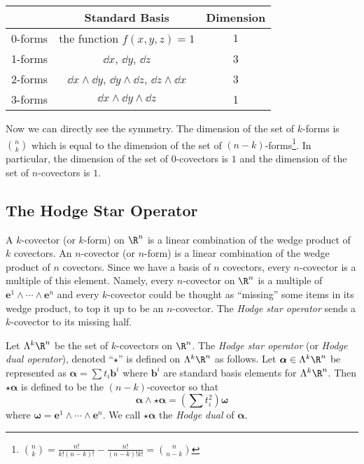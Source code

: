 \begin{center}
	\begin{tabular}{c|c|c}
	&Standard Basis & Dimension\\
	\hline
	0-forms & the function $f(x,y,z)=1$ & $1$\\
	1-forms & $\dd x$, $\dd y$, $\dd z$ & 3\\
	2-forms & $\dd x\wedge \dd y$, $\dd y\wedge \dd z$, $\dd z\wedge \dd x$ & 3\\
	3-forms & $\dd x\wedge \dd y\wedge \dd z$ & 1
	\end{tabular}
\end{center}

Now we can directly see the symmetry.  The dimension of the set
of $k$-forms is $\binom{n}{k}$ which is equal to the dimension of the
set of $(n-k)$-forms\footnote{
	$\binom{n}{k} = \frac{n!}{k!(n-k)!} - \frac{n!}{(n-k)!k!} = \binom{n}{n-k}$
}. In particular, the dimension of the set of 0-covectors is $1$ and the dimension
of the set of $n$-covectors is $1$.

\subsection{The Hodge Star Operator}

A $k$-covector (or $k$-form) on $\R^n$ is a linear combination of the
wedge product of $k$ covectors.  An $n$-covector (or $n$-form) is a linear
combination of the wedge product of $n$ covectors.  Since we have a basis
of $n$ covectors, every $n$-covector is a multiple of this element.  Namely,
every $n$-covector on $\R^n$ is a multiple of $\bm e^1\wedge \cdots \wedge \bm e^n$
and every $k$-covector could be thought as ``missing'' some items in its wedge
product, to top it up to be an $n$-covector.  The \emph{Hodge star operator}
sends a $k$-covector to its missing half.

\begin{definition}
	Let $\Lambda^k\R^n$ be the set of $k$-covectors on $\R^n$.
	The \emph{Hodge star operator} (or \emph{Hodge dual operator}),
	denoted ``$\star$'' is defined on $\Lambda^k\R^n$ as follows.
	Let $\bm\alpha\in \Lambda^k\R^n$ be represented as
	$\bm\alpha = \sum t_i \bm b^i$ where $\bm b^i$ are standard basis
	elements for $\Lambda^k\R^n$.  Then $\star \bm\alpha$ is defined
	to be the $(n-k)$-covector so that
	\[
		\bm\alpha\wedge \star\bm\alpha = \left(\sum t_i^2\right)\bm\omega
	\]
	where $\bm\omega = \bm e^1\wedge \cdots\wedge \bm e^n$.  We call $\star\bm\alpha$
	the \emph{Hodge dual} of $\bm\alpha$.
\end{definition}

